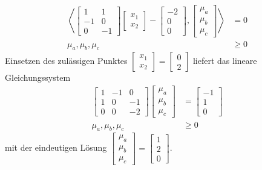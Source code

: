 \begin{compactenum}[(i)]
\begin{align*}
\left\langle\begin{bmatrix}1&1\\-1&0\\0&-1\end{bmatrix}\begin{bmatrix}x_1\\x_2\end{bmatrix}- \begin{bmatrix}-2\\0\\0\end{bmatrix} ,\begin{bmatrix}\mu_a\\\mu_b\\\mu_c\end{bmatrix} \right\rangle &=0\\\mu_a,\mu_b,\mu_c&\geq 0\end{align*}
Einsetzen des zulässigen Punktes $\begin{bmatrix}x_1\\x_2\end{bmatrix}=\begin{bmatrix}0\\2\end{bmatrix}$ liefert das lineare Gleichungssystem 
\begin{align*}\begin{bmatrix}1&-1&0\\1&0&-1\\0&0&-2\end{bmatrix}\begin{bmatrix}\mu_a\\\mu_b\\\mu_c\end{bmatrix}&=\begin{bmatrix}-1\\1\\0\end{bmatrix}\\\mu_a,\mu_b,\mu_c&\geq 0\end{align*}
mit der eindeutigen Lösung $\begin{bmatrix}\mu_a\\\mu_b\\\mu_c\end{bmatrix}=\begin{bmatrix}1\\2\\0\end{bmatrix}$.\\\\

\end{compactenum}

